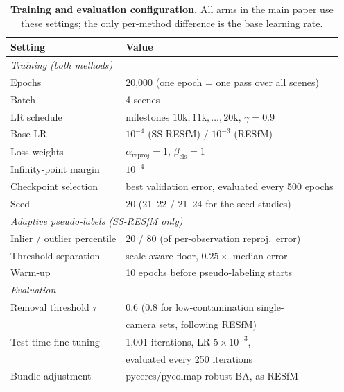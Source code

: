 \documentclass{article}
\begin{document}
\begin{table}[tb]\centering\footnotesize
\caption{\textbf{Training and evaluation configuration.} All arms in the main paper use
these settings; the only per-method difference is the base learning rate.}
\label{tab:supp_config}
\setlength{\tabcolsep}{4pt}%
\begin{tabular}{ll}
\toprule
Setting & Value\\
\midrule
\multicolumn{2}{l}{\emph{Training (both methods)}}\\
Epochs & 20{,}000 (one epoch = one pass over all scenes)\\
Batch & 4 scenes\\
LR schedule & milestones $10\text{k},11\text{k},\ldots,20\text{k}$, $\gamma=0.9$\\
Base LR & $10^{-4}$ (SS-RESfM) / $10^{-3}$ (RESfM)\\
Loss weights & $\alpha_{\text{reproj}}=1$, $\beta_{\text{cls}}=1$\\
Infinity-point margin & $10^{-4}$\\
Checkpoint selection & best validation error, evaluated every 500 epochs\\
Seed & 20 (21--22 / 21--24 for the seed studies)\\
\midrule
\multicolumn{2}{l}{\emph{Adaptive pseudo-labels (SS-RESfM only)}}\\
Inlier / outlier percentile & 20 / 80 (of per-observation reproj.\ error)\\
Threshold separation & scale-aware floor, $0.25\times$ median error\\
Warm-up & 10 epochs before pseudo-labeling starts\\
\midrule
\multicolumn{2}{l}{\emph{Evaluation}}\\
Removal threshold $\tau$ & 0.6 (0.8 for low-contamination single-\\
 & camera sets, following RESfM)\\
Test-time fine-tuning & 1{,}001 iterations, LR $5\times10^{-3}$,\\
 & evaluated every 250 iterations\\
Bundle adjustment & pyceres/pycolmap robust BA, as RESfM\\
\bottomrule
\end{tabular}
\end{table}
\end{document}
